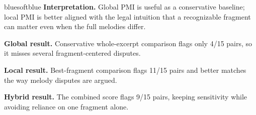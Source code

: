 \documentclass[portrait,a0,final]{a0poster}
\begin{document}
\begin{panelbox}[height=270mm]
\begin{minipage}[t]{0.615\linewidth}
\vspace{4mm}
\begin{callout}{blue}{softblue}
\textbf{Interpretation.}
Global PMI is useful as a conservative baseline; local PMI is better aligned with the legal intuition that a recognizable fragment can matter even when the full melodies differ.
\end{callout}
\end{minipage}
\par\vspace{6mm}
\begin{whitebox}[height=48mm]
\begin{minipage}[t]{0.31\linewidth}
{\bfseries\color{blue}Global result.}
Conservative whole-excerpt comparison flags only 4/15 pairs, so it misses several fragment-centered disputes.
\end{minipage}
\hfill
\begin{minipage}[t]{0.31\linewidth}
{\bfseries\color{green}Local result.}
Best-fragment comparison flags 11/15 pairs and better matches the way melody disputes are argued.
\end{minipage}
\hfill
\begin{minipage}[t]{0.31\linewidth}
{\bfseries\color{amber}Hybrid result.}
The combined score flags 9/15 pairs, keeping sensitivity while avoiding reliance on one fragment alone.
\end{minipage}
\end{whitebox}
\end{panelbox}

\vspace{7mm}
\end{document}
